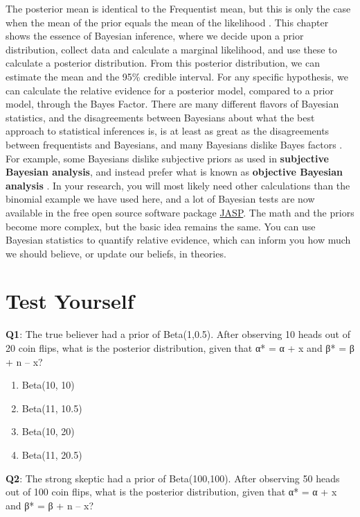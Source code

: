 \documentclass[
  oneside]{book}
\providecommand{\tightlist}{%
  \setlength{\itemsep}{0pt}\setlength{\parskip}{0pt}}
\begin{document}
The posterior mean is identical to the Frequentist mean, but this is only the case when the mean of the prior equals the mean of the likelihood \citep{albers_credible_2018}. This chapter shows the essence of Bayesian inference, where we decide upon a prior distribution, collect data and calculate a marginal likelihood, and use these to calculate a posterior distribution. From this posterior distribution, we can estimate the mean and the 95\% credible interval. For any specific hypothesis, we can calculate the relative evidence for a posterior model, compared to a prior model, through the Bayes Factor. There are many different flavors of Bayesian statistics, and the disagreements between Bayesians about what the best approach to statistical inferences is, is at least as great as the disagreements between frequentists and Bayesians, and many Bayesians dislike Bayes factors \citep{mcelreath_statistical_2016}. For example, some Bayesians dislike subjective priors as used in \textbf{subjective Bayesian analysis}, and instead prefer what is known as \textbf{objective Bayesian analysis} \citep{berger_interplay_2004}. In your research, you will most likely need other calculations than the binomial example we have used here, and a lot of Bayesian tests are now available in the free open source software package \href{https://jasp-stats.org/}{JASP}. The math and the priors become more complex, but the basic idea remains the same. You can use Bayesian statistics to quantify relative evidence, which can inform you how much we should believe, or update our beliefs, in theories.

\hypertarget{test-yourself-3}{%
\section{Test Yourself}\label{test-yourself-3}}

\textbf{Q1}: The true believer had a prior of Beta(1,0.5). After observing 10 heads out of 20 coin flips, what is the posterior distribution, given that α* = α + x and β* = β + n -- x?

\begin{enumerate}
\def\labelenumi{\Alph{enumi})}
\tightlist
\item
  Beta(10, 10)
\item
  Beta(11, 10.5)
\item
  Beta(10, 20)
\item
  Beta(11, 20.5)
\end{enumerate}

\textbf{Q2}: The strong skeptic had a prior of Beta(100,100). After observing 50 heads out of 100 coin flips, what is the posterior distribution, given that α* = α + x and β* = β + n -- x?
\end{document}

